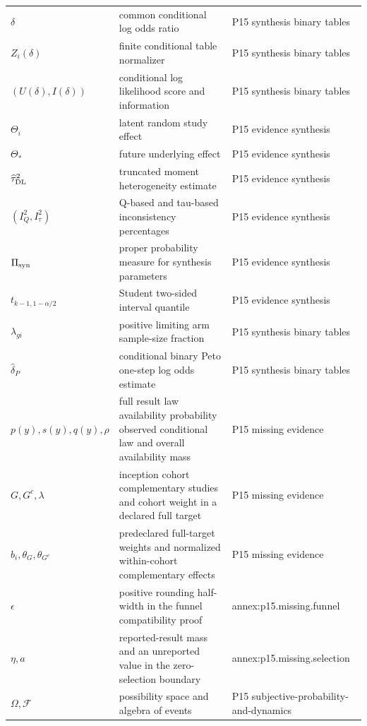 \begin{longtable}{@{}p{}p{}p{}@{}}
\(\delta\) & common conditional log odds ratio & P15 synthesis binary tables \\
\(Z_i(\delta)\) & finite conditional table normalizer & P15 synthesis binary tables \\
\((U(\delta),\allowbreak I(\delta))\) & conditional log likelihood score and information & P15 synthesis binary tables \\
\(\Theta_i\) & latent random study effect & P15 evidence synthesis \\
\(\Theta_*\) & future underlying effect & P15 evidence synthesis \\
\(\widehat\tau_{\rm DL}^2\) & truncated moment heterogeneity estimate & P15 evidence synthesis \\
\((I_Q^2,\allowbreak I_\tau^2)\) & Q-based and tau-based inconsistency percentages & P15 evidence synthesis \\
\(\Pi_{\rm syn}\) & proper probability measure for synthesis parameters & P15 evidence synthesis \\
\(t_{k-1,1-\alpha/2}\) & Student two-sided interval quantile & P15 evidence synthesis \\
\(\lambda_{gi}\) & positive limiting arm sample-size fraction & P15 synthesis binary tables \\
\(\widehat\delta_P\) & conditional binary Peto one-step log odds estimate & P15 synthesis binary tables \\
\(p(y),\allowbreak s(y),\allowbreak q(y),\allowbreak \rho\) & full result law availability probability observed conditional law and overall availability mass & P15 missing evidence \\
\(G,\allowbreak G^c,\allowbreak \lambda\) & inception cohort complementary studies and cohort weight in a declared full target & P15 missing evidence \\
\(b_i,\allowbreak \theta_G,\allowbreak \theta_{G^c}\) & predeclared full-target weights and normalized within-cohort complementary effects & P15 missing evidence \\
\(\epsilon\) & positive rounding half-width in the funnel compatibility proof & annex:\allowbreak{}p15.\allowbreak{}missing.\allowbreak{}funnel \\
\(\eta,\allowbreak a\) & reported-result mass and an unreported value in the zero-selection boundary & annex:\allowbreak{}p15.\allowbreak{}missing.\allowbreak{}selection \\
\(\Omega,\allowbreak \mathcal F\) & possibility space and algebra of events & P15 subjective-\allowbreak{}probability-\allowbreak{}and-\allowbreak{}dynamics \\

\end{longtable}
